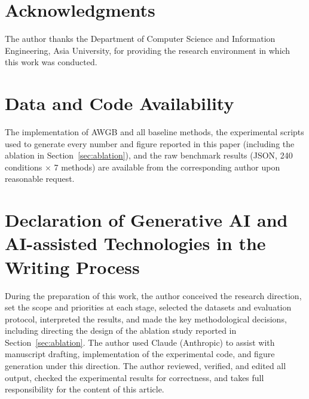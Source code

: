 \documentclass[final,3p,times,twocolumn,nopreprintline]{elsarticle}
\begin{document}
\section*{Acknowledgments}
The author thanks the Department of Computer Science and Information Engineering, Asia University, for providing the research environment in which this work was conducted.

\section*{Data and Code Availability}
The implementation of AWGB and all baseline methods, the experimental scripts used to generate every number and figure reported in this paper (including the ablation in Section~\ref{sec:ablation}), and the raw benchmark results (JSON, 240 conditions $\times$ 7 methods) are available from the corresponding author upon reasonable request.

\section*{Declaration of Generative AI and AI-assisted Technologies in the Writing Process}
During the preparation of this work, the author conceived the research direction, set the scope and priorities at each stage, selected the datasets and evaluation protocol, interpreted the results, and made the key methodological decisions, including directing the design of the ablation study reported in Section~\ref{sec:ablation}. The author used Claude (Anthropic) to assist with manuscript drafting, implementation of the experimental code, and figure generation under this direction. The author reviewed, verified, and edited all output, checked the experimental results for correctness, and takes full responsibility for the content of this article.



\end{document}
